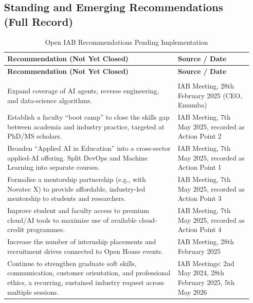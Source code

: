 \subsection{Standing and Emerging Recommendations (Full Record)}

\begingroup
\footnotesize
\setlength{\tabcolsep}{4pt}
\renewcommand{\arraystretch}{1.2}
\begin{longtable}[]{@{}>{\raggedright\arraybackslash}p{}>{\raggedright\arraybackslash}p{}@{}}
\caption{Open IAB Recommendations Pending Implementation}\label{tab:iab_open}\\
\toprule
\textbf{Recommendation (Not Yet Closed)} & \textbf{Source / Date}\\
\midrule
\endfirsthead
\toprule
\textbf{Recommendation (Not Yet Closed)} & \textbf{Source / Date}\\
\midrule
\endhead
\midrule
\multicolumn{2}{r}{\footnotesize\itshape Continued on next page}\\
\endfoot
\bottomrule
\endlastfoot
Expand coverage of AI agents, reverse engineering, and data-science algorithms. & IAB Meeting, 28th February 2025 (CEO, Emumba)\\
Establish a faculty ``boot camp'' to close the skills gap between academia and industry practice, targeted at PhD/MS scholars. & IAB Meeting, 7th May 2025, recorded as Action Point 2\\
Broaden ``Applied AI in Education'' into a cross-sector applied-AI offering. Split DevOps and Machine Learning into separate courses. & IAB Meeting, 7th May 2025, recorded as Action Point 1\\
Formalise a mentorship partnership (e.g., with Novatec X) to provide affordable, industry-led mentorship to students and researchers. & IAB Meeting, 7th May 2025, recorded as Action Point 3\\
Improve student and faculty access to premium cloud/AI tools to maximise use of available cloud-credit programmes. & IAB Meeting, 7th May 2025, recorded as Action Point 4\\
Increase the number of internship placements and recruitment drives connected to Open House events. & IAB Meeting, 28th February 2025\\
Continue to strengthen graduate soft skills, communication, customer orientation, and professional ethics, a recurring, sustained industry request across multiple sessions. & IAB Meetings: 2nd May 2024, 28th February 2025, 5th May 2026\\
\end{longtable}
\endgroup

